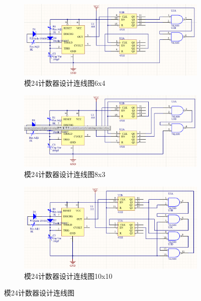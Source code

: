 \documentclass{ctexrep}
\begin{document}
\begin{figure}[htpb]
	\begin{subfigure}[htpb]{.45\linewidth}
		\centering
		\includegraphics[width=\linewidth]{6x4.png}
		\caption{模24计数器设计连线图6x4}
		\label{fig:模24计数器设计连线图6x4}
	\end{subfigure}
	\quad
	\begin{subfigure}[htpb]{.45\linewidth}
		\centering
		\includegraphics[width=\linewidth]{8x3.png}
		\caption{模24计数器设计连线图8x3}
		\label{fig:模24计数器设计连线图8x3}
	\end{subfigure}

	\begin{subfigure}[htpb]{\linewidth}
		\centering
		\includegraphics[width=\linewidth]{10x10.png}
		\caption{模24计数器设计连线图10x10}
		\label{fig:模24计数器设计连线图10x10}
	\end{subfigure}
	\caption{模24计数器设计连线图}
	\label{fig:模24计数器设计连线图}
\end{figure}
\end{document}
